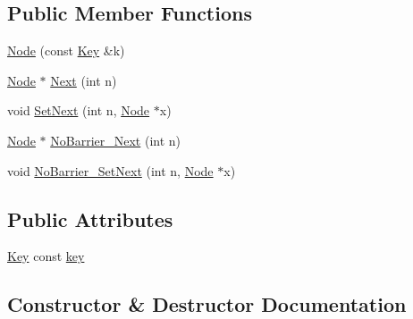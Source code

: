 \subsection*{Public Member Functions}
\begin{DoxyCompactItemize}
\item 
\mbox{\hyperlink{structleveldb_1_1_skip_list_1_1_node_a7dec52445f4f05892239a77407d109b0}{Node}} (const \mbox{\hyperlink{namespaceleveldb_a7e9a9725b13fa0bd922d885280dfab95}{Key}} \&k)
\item 
\mbox{\hyperlink{structleveldb_1_1_skip_list_1_1_node}{Node}} $\ast$ \mbox{\hyperlink{structleveldb_1_1_skip_list_1_1_node_aca7f18fc57f6c8e8a8dfe176eedbde74}{Next}} (int n)
\item 
void \mbox{\hyperlink{structleveldb_1_1_skip_list_1_1_node_a46c7cc10db3d77c85df7e411b720a8f4}{Set\+Next}} (int n, \mbox{\hyperlink{structleveldb_1_1_skip_list_1_1_node}{Node}} $\ast$x)
\item 
\mbox{\hyperlink{structleveldb_1_1_skip_list_1_1_node}{Node}} $\ast$ \mbox{\hyperlink{structleveldb_1_1_skip_list_1_1_node_a96b7213d1fd9ef893f3a7baecc5c4801}{No\+Barrier\+\_\+\+Next}} (int n)
\item 
void \mbox{\hyperlink{structleveldb_1_1_skip_list_1_1_node_af93b362f5e38fcf645820e02377cca64}{No\+Barrier\+\_\+\+Set\+Next}} (int n, \mbox{\hyperlink{structleveldb_1_1_skip_list_1_1_node}{Node}} $\ast$x)
\end{DoxyCompactItemize}
\subsection*{Public Attributes}
\begin{DoxyCompactItemize}
\item 
\mbox{\hyperlink{namespaceleveldb_a7e9a9725b13fa0bd922d885280dfab95}{Key}} const \mbox{\hyperlink{structleveldb_1_1_skip_list_1_1_node_a654f196e057edd294e4dbcbb6dabb844}{key}}
\end{DoxyCompactItemize}


\subsection{Constructor \& Destructor Documentation}
\mbox{\label{structleveldb_1_1_skip_list_1_1_node_a7dec52445f4f05892239a77407d109b0}} 
